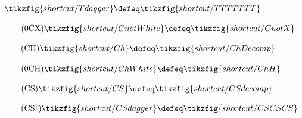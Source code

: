 \begin{figure}[H]
{{\begin{minipage}{0.975\textwidth}
\begin{minipage}{0.26\textwidth}
\begin{equation}
            \tikzfig{shortcut/Tdagger} \defeq \tikzfig{shortcut/TTTTTTT}
        \end{equation}
    \end{minipage}
    \begin{minipage}{0.35\textwidth}
        \centering
        \begin{equation}
            \tag{0CX}\label{t-CnotWhite}
            \tikzfig{shortcut/CnotWhite} \defeq \tikzfig{shortcut/CnotX}
        \end{equation}
    \end{minipage}\vspace{-0.8em}
    \begin{minipage}{0.53\textwidth}
        \centering
        \begin{equation}
            \tag{CH}\label{t-Ch}
            \tikzfig{shortcut/Ch} \defeq \tikzfig{shortcut/ChDecomp}
        \end{equation}
    \end{minipage}
    \begin{minipage}{0.35\textwidth}
        \centering
        \begin{equation}
            \tag{0CH}\label{t-ChWhite}
            \tikzfig{shortcut/ChWhite} \defeq \tikzfig{shortcut/ChH}
        \end{equation}
    \end{minipage}\vspace{-0.6em}
    \begin{minipage}{0.43\textwidth}
        \centering
        \begin{equation}
            \tag{CS}\label{t-Cs}
            \tikzfig{shortcut/CS} \defeq \tikzfig{shortcut/CSdecomp}
        \end{equation}
    \end{minipage}
    \begin{minipage}{0.39\textwidth}
        \centering
        \begin{equation}
            \tag{CS$^{\dagger}$}\label{t-Csdagger}
            \tikzfig{shortcut/CSdagger} \defeq \tikzfig{shortcut/CSCSCS}
        \end{equation}
    \end{minipage}
    \end{minipage}}
    }
\end{figure}
